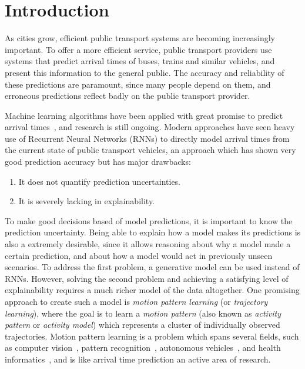\chapter{Introduction}
\label{cha:introduction}
As cities grow, efficient public transport systems
are becoming increasingly important. To offer a more efficient
service, public transport providers use systems
that predict arrival times of buses, trains and similar vehicles,
and present this information to the general public. The accuracy
and reliability of these predictions are paramount, since many
people depend on them, and erroneous predictions reflect badly on the
public transport provider.

Machine learning algorithms have been applied with great
promise to predict arrival times~\cite{kim2017probabilistic, 
  pang2018learning, Nguyen2018Jun}, and research is still ongoing.
Modern approaches have seen heavy use of Recurrent Neural Networks
(RNNs) to directly model arrival times from the current state of public
transport vehicles, an approach which has shown very good prediction accuracy
but has major drawbacks:

\begin{enumerate}
\item It does not quantify prediction uncertainties.
\item It is severely lacking in explainability.
\end{enumerate}

To make good decisions based of model predictions, it is important to 
know the prediction uncertainty. Being able to explain how
a model makes its predictions is also a extremely desirable,
since it allows reasoning about why a model made a certain prediction,
and about how a model would act in previously unseen
scenarios. 
To address the first problem, a generative model can be used instead
of RNNs. However, solving the second problem and achieving a satisfying
level of explainability requires a much richer model of the data altogether.
One promising approach to create such a model is \textit{motion
  pattern learning} (or \textit{trajectory learning}), where the goal is to learn a \textit{motion
  pattern} (also known as \textit{activity
  pattern} or \textit{activity model})
which represents a cluster of individually observed
trajectories. Motion pattern learning is a problem which spans several
fields, such as computer vision~\cite{Morris2008Sep, Zhang2006Aug,
  Kim2011Nov, Campo2017Aug}, pattern recognition~\cite{Tang2018Aug}, autonomous 
vehicles~\cite{Goli2018Jun}, and health
informatics~\cite{Pimentel2013Sep}, and is like arrival time
prediction an active area of research.

